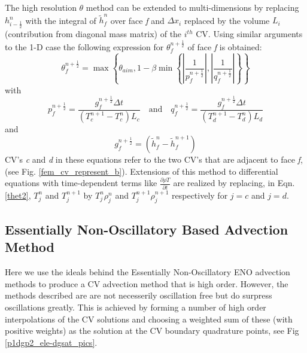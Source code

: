 The high resolution $\theta$ method can be extended to multi-dimensions by replacing $h_{i-\frac{1}{2}}^{n}$ with the integral of $\tilde{h}_{f}^{n}$ over face \textit{f} and $\Delta x_{i}$ replaced by the volume $L_{i}$ (contribution from diagonal mass matrix) of the $i^{th}$ CV. Using similar arguments to the 1-D case the following expression for $\theta_f^{n+\frac{1}{2}}$ of face \textit{f} is obtained:
\begin{equation}
\theta_f^{n+\frac{1}{2}}=\max \left\{ \theta_{aim}, 1 - \beta \min\left\{
\left|\frac{1}{p_{f}^{n+\frac{1}{2}}}\right|,\left|
\frac{1}{q_{f}^{n+\frac{1}{2}}} \right| \right\} \right\}
\label{thet1}
\end{equation}
with
\begin{equation}
p_f^{n+\frac{1}{2}} =
\frac{g_f^{n+\frac{1}{2}}\Delta t}{(T^{n+1}_{c} - T_{c}^{n}) L_{c}}
\quad \text{and} \quad q_f^{n+\frac{1}{2}} =
\frac{g_f^{n+\frac{1}{2}}\Delta t}{(T^{n+1}_{d} - T_{d}^{n}) L_{d}}
\label{thet2}
\end{equation}
and
\begin{equation}
g_f^{n+\frac{1}{2}}= (\tilde{h}_{f}^{n} - \tilde{h}_f^{n+1})
\label{gf}
\end{equation}
CV's \textit{c} and \textit{d} in these equations refer to the two CV's that are adjacent to face \textit{f}, (see Fig. \ref{fem_cv_represent_b}). Extensions of this method to differential equations with time-dependent terms like $\frac{\partial \rho T}{\partial t}$ are realized by replacing, in Eqn. \ref{thet2}, $T_j^n$ and $T_j^{n+1}$ by $T_{j}^{n} \rho_{j}^{n}$ and $T_{j}^{n+1} \rho_j^{n+1}$ respectively for $j = c$ and $j = d$.




\subsection{Essentially Non-Oscillatory Based Advection Method}
\label{Essentially Non-Oscillatory Based Advection Method}
Here we use the ideals behind the Essentially Non-Oscillatory ENO advection methods to produce a 
CV advection method that is high order. However, the methods described are are not necesserily oscillation 
free but do surpress oscillations greatly. 
This is achieved by forming a number of high order 
interpolations of the CV solutions and choosing a weighted sum of these (with positive weights) 
as the solution at the CV boundary quadrature points, see Fig \ref{p1dgp2_ele-dgsat_pics}. 

